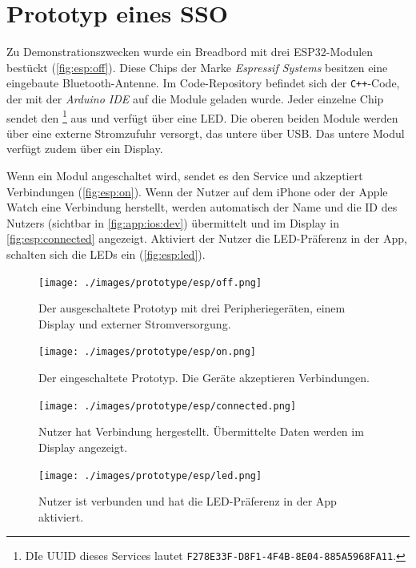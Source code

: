 \section{Prototyp eines SSO}\label{sec:esp32}

Zu Demonstrationszwecken wurde ein Breadbord mit drei ESP32-Modulen bestückt (\autoref{fig:esp:off}). Diese Chips der Marke \emph{Espressif Systems} besitzen eine eingebaute Bluetooth-Antenne. Im Code-Repository befindet sich der \texttt{C++}-Code, der mit der \emph{Arduino IDE} auf die Module geladen wurde. Jeder einzelne Chip sendet den \footnote{DIe UUID dieses Services lautet \texttt{F278E33F-D8F1-4F4B-8E04-885A5968FA11}.} aus und verfügt über eine LED. Die oberen beiden Module werden über eine externe Stromzufuhr versorgt, das untere über USB. Das untere Modul verfügt zudem über ein Display.

Wenn ein Modul angeschaltet wird, sendet es den Service und akzeptiert Verbindungen (\autoref{fig:esp:on}). Wenn der Nutzer auf dem iPhone oder der Apple Watch eine Verbindung herstellt, werden automatisch der Name und die ID des Nutzers (sichtbar in \autoref{fig:app:ios:dev}) übermittelt und im Display in \autoref{fig:esp:connected} angezeigt. Aktiviert der Nutzer die LED-Präferenz in der App, schalten sich die LEDs ein (\autoref{fig:esp:led}).

\begin{figure}[H]
	\centering
	\texttt{[image: ./images/prototype/esp/off.png]}
	\caption{\label{fig:esp:off}Der ausgeschaltete Prototyp mit drei Peripheriegeräten, einem Display und externer Stromversorgung.}
\end{figure}

\begin{figure}[H]
	\centering
	\texttt{[image: ./images/prototype/esp/on.png]}
	\caption{\label{fig:esp:on}Der eingeschaltete Prototyp. Die Geräte akzeptieren Verbindungen.}
\end{figure}

\begin{figure}[H]
	\centering
	\texttt{[image: ./images/prototype/esp/connected.png]}
	\caption{\label{fig:esp:connected}Nutzer hat Verbindung hergestellt. Übermittelte Daten werden im Display angezeigt.}
\end{figure}

\begin{figure}[H]
	\centering
	\texttt{[image: ./images/prototype/esp/led.png]}
	\caption{\label{fig:esp:led}Nutzer ist verbunden und hat die LED-Präferenz in der App aktiviert.}
\end{figure}
\clearpage

